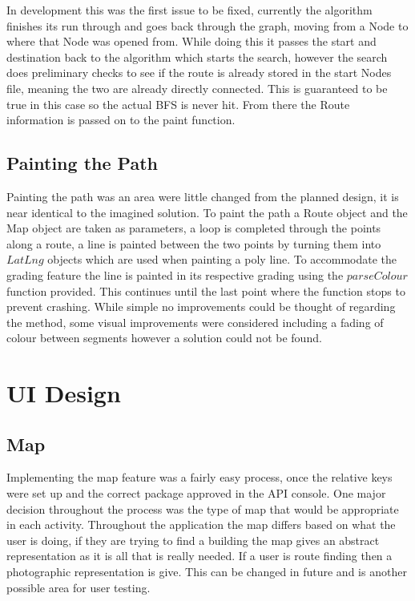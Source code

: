 In development this was the first issue to be fixed, currently the algorithm finishes its run through and goes back through the graph, moving from a Node to where that Node was opened from. While doing this it passes the start and destination back to the algorithm which starts the search, however the search does preliminary checks to see if the route is already stored in the start Nodes file, meaning the two are already directly connected. This is guaranteed to be true in this case so the actual BFS is never hit. From there the Route information is passed on to the paint function. 

\subsection{Painting the Path}
Painting the path was an area were little changed from the planned design, it is near identical to the imagined solution. To paint the path a Route object and the Map object are taken as parameters, a loop is completed through the points along a route, a line is painted between the two points by turning them into $LatLng$ objects which are used when painting a poly line. To accommodate the grading feature the line is painted in its respective grading using the $parseColour$ function provided. This continues until the last point where the function stops to prevent crashing. While simple no improvements could be thought of regarding the method, some visual improvements were considered including a fading of colour between segments however a solution could not be found. 

\section{UI Design}

\subsection{Map}

Implementing the map feature was a fairly easy process, once the relative keys were set up and the correct package approved in the API console. One major decision throughout the process was the type of map that would be appropriate in each activity. Throughout the application the map differs based on what the user is doing, if they are trying to find a building the map gives an abstract representation as it is all that is really needed. If a user is route finding then a photographic representation is give. This can be changed in future and is another possible area for user testing. 

